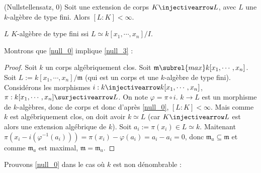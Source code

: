         \begin{theo} (Nullstellensatz, 0)
            \label{null_0}
            Soit une extension de corps $K \injectivearrow L$, avec $L$ une $k$-algèbre de type fini. Alors $[L : K] < \infty$.
        \end{theo}
        \begin{remq}
            $L$ $K$-algèbre de type fini ssi $L \simeq k[x_1, \cdots, x_n]/I$.
        \end{remq}
        Montrons que \ref{null_0} implique \ref{null_3} : 
        \begin{proof}
            Soit $k$ un corps algébriquement clos. Soit $\mathfrak{m} \subrel{max} k[x_1, \cdots, x_n]$. Soit $L := k[x_1, \cdots, x_n]/\mathfrak{m}$ (qui est un corps et une $k$-algèbre de type fini). Considérons les morphismes $i : k \injectivearrow k[x_1, \cdots, x_n]$, $\pi : k[x_1, \cdots, x_n] \surjectivearrow L$. On note $\varphi = \pi \circ i$. $k \to L$ est un morphisme de $k$-algèbres, donc de corps et donc d'après \ref{null_0}, $[L : K] < \infty$. Mais comme $k$ est algébriquement clos, on doit avoir $k \simeq L$ (car $K \injectivearrow L$ est alors une extension algébrique de $k$). Soit $a_i := \pi(x_i) \in L \simeq k$. Maitenant $\pi(x_i - i(\varphi^{-1}(a_i))) = \pi(x_i) - \varphi(a_i) = a_i - a_i = 0$, donc $\mathfrak{m}_a \subseteq \mathfrak{m}$ et comme $\mathfrak{m}_a$ est maximal, $\mathfrak{m} = \mathfrak{m}_a$. 
        \end{proof} \noindent
        Prouvons \ref{null_0} dans le cas où $k$ est non dénombrable :
